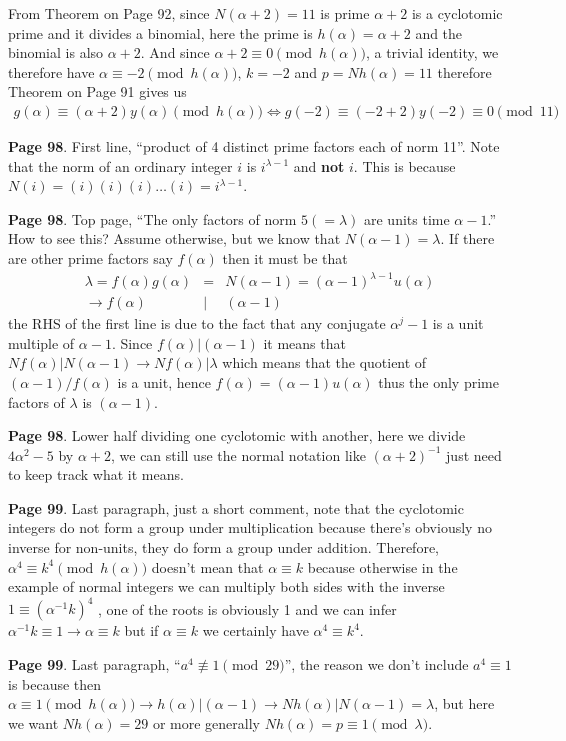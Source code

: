 \documentclass[aps,preprint,preprintnumbers,nofootinbib,showpacs,prd]{revtex4-1}
\newcommand{\nbea}{\begin{eqnarray*}}
\newcommand{\neea}{\end{eqnarray*}}
\begin{document}
From Theorem on Page 92, since $N(\alpha + 2) = 11$ is prime $\alpha + 2$ is a cyclotomic prime and it divides a binomial, here the prime is $h(\alpha) = \alpha + 2$ and the binomial is also $\alpha + 2$. And since $\alpha + 2 \equiv 0 \pmod{h(\alpha)}$, a trivial identity, we therefore have $\alpha \equiv -2 \pmod{h(\alpha)}$, $k = -2$ and $p = Nh(\alpha) = 11$ therefore Theorem on Page 91 gives us
%
\nbea
g(\alpha) \equiv (\alpha + 2)y(\alpha) \pmod{h(\alpha)} \Longleftrightarrow g(-2) \equiv (-2 + 2)y(-2) \equiv 0 \pmod{11}
\neea
%

{\bf Page 98}. First line, ``product of 4 distinct prime factors each of norm 11''. Note that the norm of an ordinary integer $i$ is $i^{\lambda-1}$ and {\bf not} $i$. This is because $N(i) = (i)(i)(i)\dots(i) = i^{\lambda-1}$.

{\bf Page 98}. Top page, ``The only factors of norm $5 (= \lambda)$ are units time $\alpha - 1$.'' How to see this? Assume otherwise, but we know that $N(\alpha - 1) = \lambda$. If there are other prime factors say $f(\alpha)$ then it must be that 
%
\nbea
\lambda = f(\alpha) g(\alpha) & = & N(\alpha - 1) = (\alpha - 1)^{\lambda - 1} u(\alpha) \\
\to f(\alpha) & | & (\alpha - 1)
\neea
%
the RHS of the first line is due to the fact that any conjugate $\alpha^j - 1$ is a unit multiple of $\alpha - 1$. Since $f(\alpha) | (\alpha - 1)$ it means that $Nf(\alpha) | N(\alpha - 1) \to Nf(\alpha) | \lambda$ which means that the quotient of $(\alpha - 1)/f(\alpha)$ is a unit, hence $f(\alpha) = (\alpha - 1)u(\alpha)$ thus the only prime factors of $\lambda$ is $(\alpha - 1)$.

{\bf Page 98}. Lower half dividing one cyclotomic with another, here we divide $4\alpha^2 - 5$ by $\alpha + 2$, we can still use the normal notation like $(\alpha + 2)^{-1}$ just need to keep track what it means.

{\bf Page 99}. Last paragraph, just a short comment, note that the cyclotomic integers do not form a group under multiplication because there's obviously no inverse for non-units, they do form a group under addition. Therefore, $\alpha^4 \equiv k^4 \pmod{h(\alpha)}$ doesn't mean that $\alpha \equiv k$ because otherwise in the example of normal integers we can multiply both sides with the inverse $1 \equiv (\alpha^{-1} k)^4$ , one of the roots is obviously 1 and we can infer $\alpha^{-1} k \equiv 1 \to \alpha \equiv k$ but if $\alpha \equiv k$ we certainly have $\alpha^4 \equiv k^4$.

{\bf Page 99}. Last paragraph, ``$a^4 \not \equiv 1 \pmod{29}$'', the reason we don't include $a^4 \equiv 1$ is because then $\alpha \equiv 1 \pmod{h(\alpha)} \to h(\alpha) | (\alpha - 1) \to Nh(\alpha) | N(\alpha - 1) = \lambda$, but here we want $Nh(\alpha) = 29$ or more generally $Nh(\alpha) = p \equiv 1 \pmod{\lambda}$.
\end{document}
